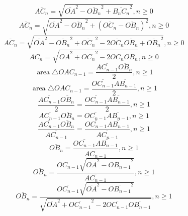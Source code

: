 \documentclass[a4paper,12pt]{report}
\DeclareMathOperator{\area}{area}
\begin{document}
\begin{equation}
\overline{AC_n} = \sqrt{\overline{OA}^2 - \overline{OB_n}^2 + \overline{B_nC_n}^2}, n \geq 0
\end{equation}
\begin{equation}
\overline{AC_n} = \sqrt{\overline{OA}^2 - \overline{OB_n}^2 + (\overline{OC_n} - \overline{OB_n})^2}, n \geq 0
\end{equation}
\begin{equation}
\overline{AC_n} = \sqrt{\overline{OA}^2 - \overline{OB_n}^2 + \overline{OC_n}^2 - 2 \overline{OC_n} \overline{OB_n} + \overline{OB_n}^2}, n \geq 0
\end{equation}
\begin{equation}
\overline{AC_n} = \sqrt{\overline{OA}^2 + \overline{OC_n}^2 - 2 \overline{OC_n} \overline{OB_n}}, n \geq 0
\end{equation}
\begin{equation}
\area \triangle OAC_{n-1} = \frac{\overline{AC_{n-1}} \overline{OB_n}}{2}, n \geq 1
\end{equation}
\begin{equation}
\area \triangle OAC_{n-1} = \frac{\overline{OC_{n-1}} \overline{AB_{n-1}}}{2}, n \geq 1
\end{equation}
\begin{equation}
\frac{\overline{AC_{n-1}} \overline{OB_n}}{2} = \frac{\overline{OC_{n-1}} \overline{AB_{n-1}}}{2}, n \geq 1
\end{equation}
\begin{equation}
\overline{AC_{n-1}} \overline{OB_n} = \overline{OC_{n-1}} \overline{AB_{n-1}}, n \geq 1
\end{equation}
\begin{equation}
\frac{\overline{AC_{n-1}} \overline{OB_n}}{\overline{AC_{n-1}}} = \frac{\overline{OC_{n-1}} \overline{AB_{n-1}}}{\overline{AC_{n-1}}}, n \geq 1
\end{equation}
\begin{equation}
\overline{OB_n} = \frac{\overline{OC_{n-1}} \overline{AB_{n-1}}}{\overline{AC_{n-1}}}, n \geq 1
\end{equation}
\begin{equation}
\overline{OB_n} = \frac{\overline{OC_{n-1}} \sqrt{\overline{OA}^2 - \overline{OB_{n-1}}^2}}{\overline{AC_{n-1}}}, n \geq 1
\end{equation}
\begin{equation}
\overline{OB_n} = \frac{\overline{OC_{n-1}} \sqrt{\overline{OA}^2 - \overline{OB_{n-1}}^2}}{\sqrt{\overline{OA}^2 + \overline{OC_{n-1}}^2 - 2 \overline{OC_{n-1}} \overline{OB_{n-1}}}}, n \geq 1
\end{equation}
\end{document}
